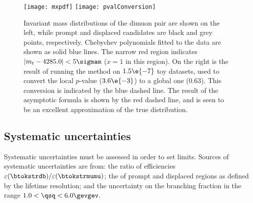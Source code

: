 \begin{figure}
  \begin{center}
    \texttt{[image: mxpdf]}
    \texttt{[image: pvalConversion]}
    \caption[dimuon mass distribution and $p$-value calculation]
    {
      Invariant mass distributions of the dimuon pair are shown on the left, while
      prompt and displaced candidates are black and grey points, respectively.
      Chebychev polynomials fitted to the data are shown as solid blue lines.
      The narrow red region indicates $|m_{t}-4285.0|<5\sigmam$ ($x=1$ in this region).
      On the right is the result of running the method on $1.5\e{-7}$ toy datasets, used to convert
      the local $p$-value ($3.6\e{-3}$) to a global one (0.63). This conversion is indicated by the
      blue dashed line.
      The result of the asymptotic formula is shown by the red dashed line, and is seen to be an
      excellent approximation of the true distribution.
    }
    \label{fig:db:mumu}
  \end{center}
\end{figure}




\subsection{Systematic uncertainties}
Systematic uncertainties must be assessed in order to set limits.
Sources of systematic uncertainties are from:
the ratio of efficiencies $\varepsilon(\btokstrdb)/\varepsilon(\btokstrmumu)$;
the of prompt and displaced regions as defined by the lifetime resolution;
and the uncertainty on the \btokstrmumu branching fraction in the range $1.0<\qsq<6.0\gevgev$.



